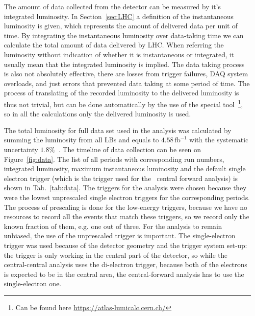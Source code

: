 The amount of data collected from the detector can be measured by it's integrated luminosity. In Section~\ref{sec:LHC} a definition of the instantaneous luminosity is given, which represents the amount of delivered data per unit of time. By integrating the instantaneous luminosity over data-taking time we can calculate the total amount of data delivered by LHC. When referring the luminosity without indication of whether it is instantaneous or integrated, it usually mean that the integrated luminosity is implied. The data taking process is also not absolutely effective, there are losses from trigger failures, DAQ system overloads, and just errors that prevented data taking at some period of time. The process of translating of the recorded luminosity to the delivered luminosity is thus not trivial, but can be done automatically by the use of the special tool~\footnote{Can be found here \url{https://atlas-lumicalc.cern.ch/}}, so in all the calculations only the delivered luminosity is used.

The total luminosity for full data set used in the analysis was calculated by summing the luminosity from all LBs and equals to \ensuremath{4.58\,\mathrm{fb}^{-1}} with the systematic uncertainty $1.8\%$~\cite{lib:lumi}. The timeline of data collection can be seen on Figure~\ref{fig:data}. The list of all periods with corresponding run numbers, integrated luminosity, maximum instantaneous luminosity and the default single electron trigger (which is the trigger used for the \Zee\ central forward analysis) is shown in Tab.~\ref{tab:data}. The triggers for the analysis were chosen because they were the lowest unprescaled single electron triggers for the corresponding periods. The process of prescaling is done for the low-energy triggers, because we have no resources to record all the events that match these triggers, so we record only the known fraction of them, e.g. one out of three. For the analysis to remain unbiased, the use of the unprescaled trigger is important. The single-electron trigger was used because of the detector geometry and the trigger system set-up: the trigger is only working in the central part of the detector, so while the central-central analysis uses the di-electron trigger, because both of the electrons is expected to be in the central area, the central-forward analysis has to use the single-electron one.

